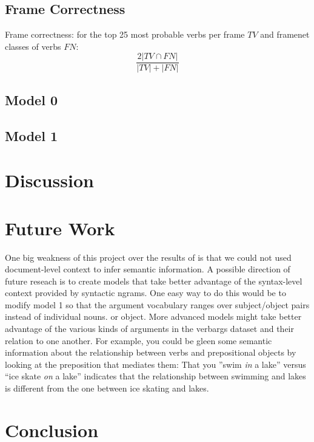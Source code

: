 \documentclass{article} %
\begin{document}
\subsection{Frame Correctness}

Frame correctness: for the top 25 most probable verbs per frame $TV$ and framenet classes of verbs $FN$: \[\frac{2|TV\cap FN|}{|TV|+|FN|}\]

\subsection{Model 0}
\subsection{Model 1}


\section{Discussion}


\section{Future Work}
One big weakness of this project over the results of \citet{oconnor2013} is that 
we could not used document-level context to infer semantic information.
A possible direction of future reseach is to create models that take better 
advantage of the syntax-level context provided by syntactic ngrams. 
One easy way to do this would be to modify model 1 so that the argument 
vocabulary ranges over subject/object pairs instead of individual nouns.
or object.
More advanced models might take better advantage of the various kinds of arguments
in the verbargs dataset and their relation to one another.
For example, you could be gleen some semantic information about the relationship between
verbs and prepositional objects by looking at the preposition that mediates them: 
That you ''swim \emph{in} a lake'' versus ``ice skate \emph{on} a lake'' 
indicates that the relationship between swimming and lakes is different from the one between
ice skating and lakes.

\section{Conclusion}



\end{document}
